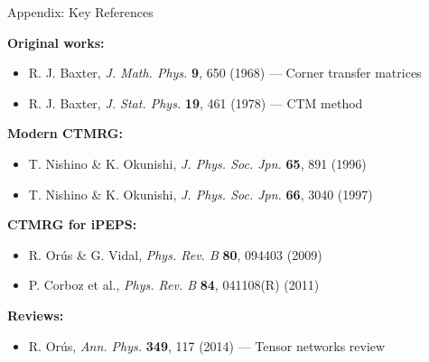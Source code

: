 \documentclass[aspectratio=169, 11pt]{beamer}
\begin{document}
\begin{frame}{Appendix: Key References}
    
    \textbf{Original works:}
    \begin{itemize}
        \item R. J. Baxter, \textit{J. Math. Phys.} \textbf{9}, 650 (1968) --- Corner transfer matrices
        \item R. J. Baxter, \textit{J. Stat. Phys.} \textbf{19}, 461 (1978) --- CTM method
    \end{itemize}
    
    \vspace{0.3cm}
    
    \textbf{Modern CTMRG:}
    \begin{itemize}
        \item T. Nishino \& K. Okunishi, \textit{J. Phys. Soc. Jpn.} \textbf{65}, 891 (1996)
        \item T. Nishino \& K. Okunishi, \textit{J. Phys. Soc. Jpn.} \textbf{66}, 3040 (1997)
    \end{itemize}
    
    \vspace{0.3cm}
    
    \textbf{CTMRG for iPEPS:}
    \begin{itemize}
        \item R. Orús \& G. Vidal, \textit{Phys. Rev. B} \textbf{80}, 094403 (2009)
        \item P. Corboz et al., \textit{Phys. Rev. B} \textbf{84}, 041108(R) (2011)
    \end{itemize}
    
    \vspace{0.3cm}
    
    \textbf{Reviews:}
    \begin{itemize}
        \item R. Orús, \textit{Ann. Phys.} \textbf{349}, 117 (2014) --- Tensor networks review
    \end{itemize}
\end{frame}
\end{document}

